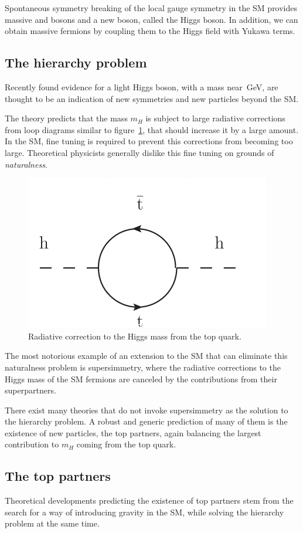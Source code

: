 Spontaneous symmetry breaking of the local gauge symmetry in the SM provides massive
\W and \Z bosons and a new boson, called the Higgs boson.
In addition, we can obtain massive fermions by coupling them to the Higgs
field with Yukawa terms.

\subsection{The hierarchy problem}
Recently found evidence for a light Higgs boson, with a mass
near~\unit[125]{GeV}, are thought to be an indication of new symmetries and
new particles beyond the SM.

The theory predicts that the mass $m_H$ is subject to large radiative
corrections from loop diagrams similar to figure~\ref{fig:higgs_correction},
that should increase it by a large amount.
In the SM, fine tuning is required to prevent this corrections from becoming
too large. Theoretical physicists generally dislike this fine tuning on grounds of
\emph{naturalness}.

\begin{figure}[htb]
    \centering
    \includegraphics[width=.4\textwidth]{images/pdf/higgs_correction}
    \caption{Radiative correction to the Higgs mass from the top quark.}
    \label{fig:higgs_correction}
\end{figure}

The most notorious example of an extension to the SM that can eliminate this
naturalness problem is supersimmetry, where the radiative corrections to
the Higgs mass of the SM fermions are canceled by the contributions from
their superpartners.

There exist many theories that do not invoke supersimmetry as the solution
to the hierarchy problem. A robust and generic prediction of many of them is the
existence of new particles, the top partners, again balancing the
largest contribution to $m_H$ coming from the top quark.

\subsection{The top partners}
Theoretical developments predicting the existence of top partners stem from
the search for a way of introducing gravity in the SM, while solving the
hierarchy problem at the same time.

